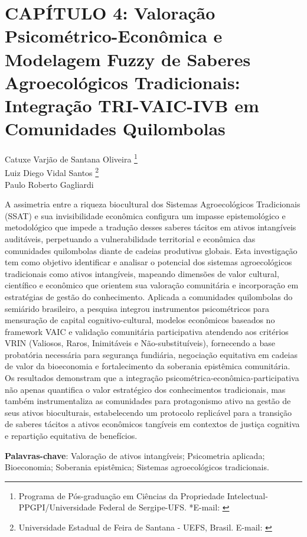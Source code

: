 \pagestyle{plain}

\chapter{CAPÍTULO 4: Valoração Psicométrico-Econômica e Modelagem Fuzzy de Saberes Agroecológicos Tradicionais: Integração TRI-VAIC-IVB em Comunidades Quilombolas}


\begin{flushright}
Catuxe Varjão de Santana Oliveira  \footnote[1]{Programa de Pós-graduação em Ciências da Propriedade Intelectual-PPGPI/Universidade Federal de Sergipe-UFS. *E-mail:  \href{mailto:catuxe@academico.ufs.br}{}}
\\[0.3cm]
Luiz Diego Vidal Santos \footnote[2]{Universidade Estadual de Feira de Santana - UEFS, Brasil. E-mail: \href{mailto:ldvsantos@uefs.br}{}}
\\[0.3cm]
Paulo Roberto Gagliardi \footnotemark[1]
\end{flushright}


{\renewcommand{\PRIVATEbookmarkthis}[1]{}%
\begin{resumoumacoluna}
A assimetria entre a riqueza biocultural dos Sistemas Agroecológicos Tradicionais (SSAT) e sua invisibilidade econômica configura um impasse epistemológico e metodológico que impede a tradução desses saberes tácitos em ativos intangíveis auditáveis, perpetuando a vulnerabilidade territorial e econômica das comunidades quilombolas diante de cadeias produtivas globais. Esta investigação tem como objetivo identificar e analisar o potencial dos sistemas agroecológicos tradicionais como ativos intangíveis, mapeando dimensões de valor cultural, científico e econômico que orientem sua valoração comunitária e incorporação em estratégias de gestão do conhecimento. Aplicada a comunidades quilombolas do semiárido brasileiro, a pesquisa integrou instrumentos psicométricos para mensuração de capital cognitivo-cultural, modelos econômicos baseados no framework VAIC e validação comunitária participativa atendendo aos critérios VRIN (Valiosos, Raros, Inimitáveis e Não-substituíveis), fornecendo a base probatória necessária para segurança fundiária, negociação equitativa em cadeias de valor da bioeconomia e fortalecimento da soberania epistêmica comunitária. Os resultados demonstram que a integração psicométrica-econômica-participativa não apenas quantifica o valor estratégico dos conhecimentos tradicionais, mas também instrumentaliza as comunidades para protagonismo ativo na gestão de seus ativos bioculturais, estabelecendo um protocolo replicável para a transição de saberes tácitos a ativos econômicos tangíveis em contextos de justiça cognitiva e repartição equitativa de benefícios.

\vspace{\onelineskip}
\noindent
\textbf{Palavras-chave}: Valoração de ativos intangíveis; Psicometria aplicada; Bioeconomia; Soberania epistêmica; Sistemas agroecológicos tradicionais.
\end{resumoumacoluna}}

